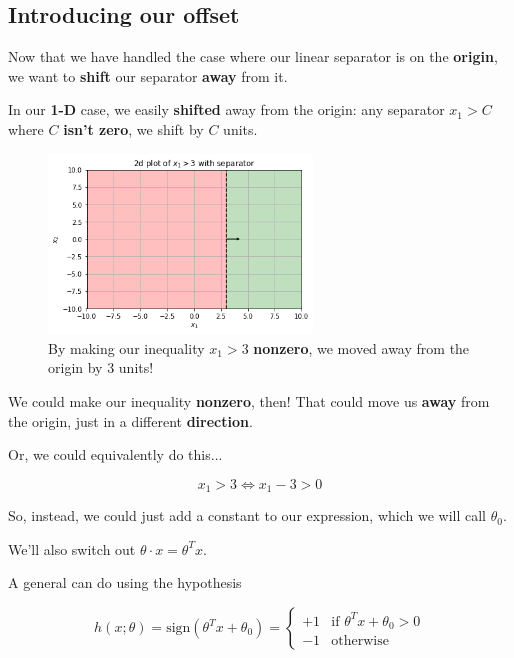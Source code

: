     \subsection{Introducing our offset}
        
        Now that we have handled the case where our linear separator is on the \textbf{origin}, we want to \textbf{shift} our separator \textbf{away} from it.
        
        In our \textbf{1-D} case, we easily \textbf{shifted} away from the origin: any separator $x_1>C$ where $C$ \textbf{isn't zero}, we shift by $C$ units.
        
        \begin{figure}[H]
            \centering
                \includegraphics[width=70mm,scale=0.5]{images/classification_images/x1_2d_plot_separator.png}
                \caption*{By making our inequality $x_1>3$ \textbf{nonzero}, we moved away from the origin by 3 units!}
        \end{figure}
        
        We could make our inequality \textbf{nonzero}, then! That could move us \textbf{away} from the origin, just in a different \textbf{direction}.
        
        Or, we could equivalently do this...
        
        \begin{equation}
            x_1 >3 \Longleftrightarrow x_1-3 > 0
        \end{equation}
        
        So, instead, we could just add a constant to our expression, which we will call $\theta_0$.
        
        We'll also switch out $\theta \cdot x = \theta^T x$.\\
        
        \begin{kequation}
            A general  can do  using the hypothesis
            
            \begin{equation*}
                h(x; \theta) = \text{sign}(\theta^T x + \theta_0 )= 
                \begin{cases}
                    +1 & \text{if $\theta^T x + \theta_0 > 0$} \\
                    -1 & \text{otherwise}
                \end{cases}
            \end{equation*}
        \end{kequation}
        
